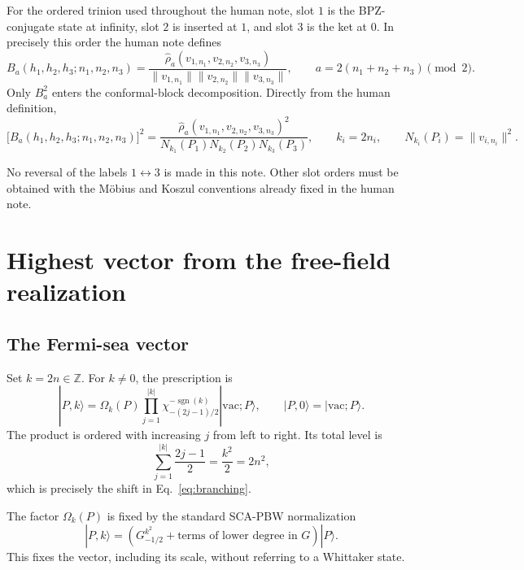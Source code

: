 \documentclass[11pt]{article}
\newcommand{\hatrho}{\widehat\rho}
\begin{document}
For the ordered trinion used throughout the human note, slot \(1\) is the
BPZ-conjugate state at infinity, slot \(2\) is inserted at \(1\), and slot
\(3\) is the ket at \(0\).  In precisely this order the human note defines
\begin{equation}
 B_a(h_1,h_2,h_3;n_1,n_2,n_3)
 =\frac{
  \hatrho_a(v_{1,n_1},v_{2,n_2},v_{3,n_3})
 }{
  \lVert v_{1,n_1}\rVert
  \lVert v_{2,n_2}\rVert
  \lVert v_{3,n_3}\rVert
 },
 \qquad
 a=2(n_1+n_2+n_3)\pmod2.
 \label{eq:B-definition}
\end{equation}
Only \(B_a^2\) enters the conformal-block decomposition.  Directly from the
human definition,
\begin{equation}
 \bigl[B_a(h_1,h_2,h_3;n_1,n_2,n_3)\bigr]^2
 =\frac{\hatrho_a(v_{1,n_1},v_{2,n_2},v_{3,n_3})^2}
 {N_{k_1}(P_1)N_{k_2}(P_2)N_{k_3}(P_3)},
 \qquad
 k_i=2n_i,
 \qquad
 N_{k_i}(P_i)=\lVert v_{i,n_i}\rVert^2.
 \label{eq:B-square-target}
\end{equation}

No reversal of the labels \(1\leftrightarrow3\) is made in this note.  Other
slot orders must be obtained with the M\"obius and Koszul conventions already
fixed in the human note.

\section{Highest vector from the free-field realization}

\subsection{The Fermi-sea vector}

Set \(k=2n\in\mathbb Z\).  For \(k\ne0\), the prescription is
\begin{equation}
 |P,k\rangle
 =\Omega_k(P)
 \prod_{j=1}^{|k|}
 \chi_{-(2j-1)/2}^{-\operatorname{sgn}(k)}
 |\mathrm{vac};P\rangle,
 \qquad
 |P,0\rangle=|\mathrm{vac};P\rangle.
 \label{eq:free-field-vector}
\end{equation}
The product is ordered with increasing \(j\) from left to right.  Its total
level is
\begin{equation}
 \sum_{j=1}^{|k|}\frac{2j-1}{2}=\frac{k^2}{2}=2n^2,
 \label{eq:Fermi-level}
\end{equation}
which is precisely the shift in Eq.~\eqref{eq:branching}.

The factor \(\Omega_k(P)\) is fixed by the standard SCA-PBW normalization
\begin{equation}
 |P,k\rangle
 =\left(G_{-1/2}^{k^2}+\text{terms of lower degree in }G\right)|P\rangle.
 \label{eq:PBW-normalization}
\end{equation}
This fixes the vector, including its scale, without referring to a Whittaker
state.
\end{document}

